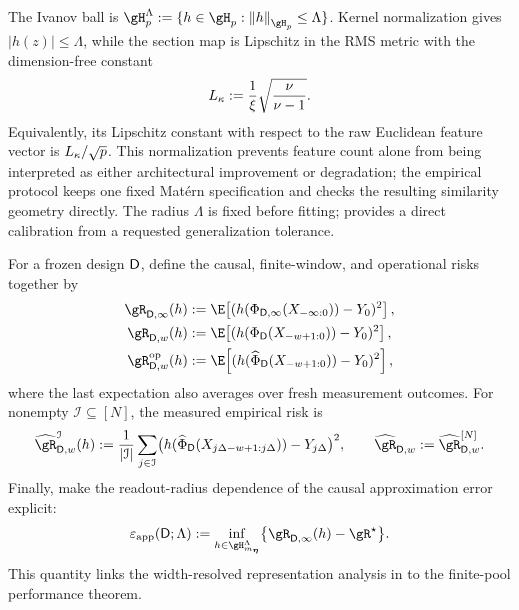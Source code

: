 The Ivanov ball is
$\RKHS_p^\Lambda:=\{h\in\RKHS_p:\norm{h}_{\RKHS_p}\leq\Lambda\}$.  Kernel
normalization gives $|h(z)|\leq\Lambda$, while the section map is Lipschitz
in the RMS metric with the dimension-free constant
\[
    L_{\kappa}:=\frac1\xi\sqrt{\frac\nu{\nu-1}}.
\]
Equivalently, its Lipschitz constant with respect to the raw Euclidean feature
vector is $L_{\kappa}/\sqrt p$.  This normalization prevents feature count alone
from being interpreted as either architectural improvement or degradation;
the empirical protocol keeps one fixed Mat\'ern specification and checks the
resulting similarity geometry directly.
The radius $\Lambda$ is fixed before fitting; 
provides a direct calibration from a requested generalization tolerance.

For a frozen design $\mathsf D$, define the causal, finite-window, and
operational risks together by
\begin{align*}
    \risk_{\design,\infty}(h)
    &:=\E\!\left[(h(\featureMap_{\design,\infty}(X_{-\infty:0}))-Y_0)^2\right],\\
    \risk_{\design,w}(h)
    &:=\E\!\left[(h(\featureMap_{\design}(X_{-w+1:0}))-Y_0)^2\right],\\
    \oprisk_{\design,w}(h)
    &:=\E\!\left[(h(\measuredFeatureMap_{\design}(X_{-w+1:0}))-Y_0)^2\right],
\end{align*}
where the last expectation also averages over fresh measurement outcomes.
For nonempty $\mathcal I\subseteq[N]$, the measured empirical risk is
\[
    \erisk_{\design,w}^{\mathcal I}(h)
    :=\frac1{|\mathcal I|}\sum_{j\in\mathcal I}
      \bigl(h(\measuredFeatureMap_{\design}(X_{j\Delta-w+1:j\Delta}))
      -Y_{j\Delta}\bigr)^2,
    \qquad
    \erisk_{\design,w}:=\erisk_{\design,w}^{[N]}.
\]
Finally, make the readout-radius dependence of the causal approximation error
explicit:
\begin{equation}
    \epsApp(\design;\Lambda)
    :=\inf_{h\in\RKHS_{m_{\arch}}^\Lambda}
      \bigl\{\risk_{\design,\infty}(h)-\risk^\star\bigr\}.
    \label{eq:design-approximation-error}
\end{equation}
This quantity links the width-resolved representation analysis in
 to the finite-pool performance theorem.
